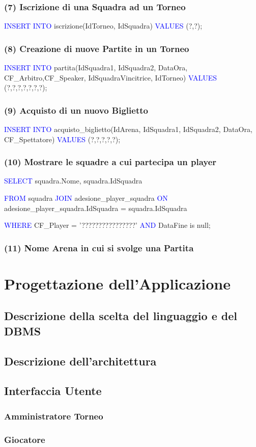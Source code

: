 \documentclass[a4paper,12pt]{report}
\begin{document}
\subsection*{(7) Iscrizione di una Squadra ad un Torneo}
\textcolor{blue}{INSERT INTO} iscrizione(IdTorneo, IdSquadra)
\textcolor{blue}{VALUES} (?,?);

\subsection*{(8) Creazione di nuove Partite in un Torneo}
\textcolor{blue}{INSERT INTO} partita(IdSquadra1, IdSquadra2, DataOra, CF\_Arbitro,CF\_Speaker, IdSquadraVincitrice, IdTorneo)
\textcolor{blue}{VALUES} (?,?,?,?,?,?,?);

\subsection*{(9) Acquisto di un nuovo Biglietto}
\textcolor{blue}{INSERT INTO} acquisto\_biglietto(IdArena, IdSquadra1, IdSquadra2, DataOra, CF\_Spettatore)
\textcolor{blue}{VALUES} (?,?,?,?,?);

\subsection*{(10) Mostrare le squadre a cui partecipa un player}
\textcolor{blue}{SELECT} squadra.Nome, squadra.IdSquadra 

\noindent \textcolor{blue}{FROM} squadra \textcolor{blue}{JOIN} adesione\_player\_squadra \textcolor{blue}{ON} adesione\_player\_squadra.IdSquadra = squadra.IdSquadra 

\noindent \textcolor{blue}{WHERE} CF\_Player = '????????????????' \textcolor{blue}{AND} DataFine is null;
\subsection*{(11) Nome Arena in cui si svolge una Partita}

\chapter{Progettazione dell'Applicazione}
\section{Descrizione della scelta del linguaggio e del DBMS}
\section{Descrizione dell'architettura}
\section{Interfaccia Utente}
\subsection{Amministratore Torneo}
\subsection{Giocatore}
\end{document}
